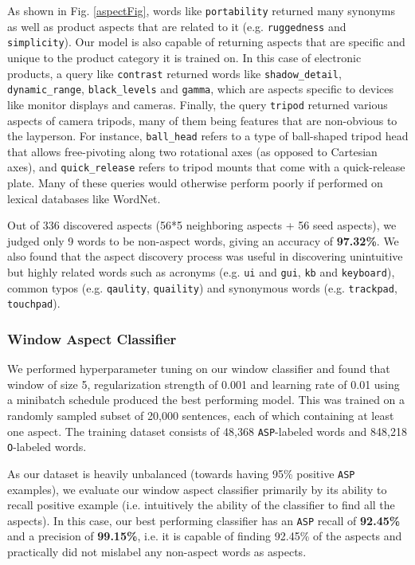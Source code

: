 \documentclass{article} %
\begin{document}
As shown in Fig. \ref{aspectFig}, words like \texttt{portability} returned many synonyms as well as product aspects that are related to it (e.g. \texttt{ruggedness} and \texttt{simplicity}). Our model is also capable of returning aspects that are specific and unique to the product category it is trained on. In this case of electronic products, a query like \texttt{contrast} returned words like \texttt{shadow\_detail}, \texttt{dynamic\_range}, \texttt{black\_levels} and \texttt{gamma}, which are aspects specific to devices like monitor displays and cameras. Finally, the query \texttt{tripod} returned various aspects of camera tripods, many of them being features that are non-obvious to the layperson. For instance, \texttt{ball\_head} refers to a type of ball-shaped tripod head that allows free-pivoting along two rotational axes (as opposed to Cartesian axes), and \texttt{quick\_release} refers to tripod mounts that come with a quick-release plate. Many of these queries would otherwise perform poorly if performed on lexical databases like WordNet.

Out of 336 discovered aspects (56*5 neighboring aspects + 56 seed aspects), we judged only 9 words to be non-aspect words, giving an accuracy of \textbf{97.32\%}. We also found that the aspect discovery process was useful in discovering unintuitive but highly related words such as acronyms (e.g. \texttt{ui} and \texttt{gui}, \texttt{kb} and \texttt{keyboard}), common typos (e.g. \texttt{qaulity}, \texttt{quaility}) and synonymous words (e.g. \texttt{trackpad}, \texttt{touchpad}).

\subsubsection{Window Aspect Classifier}
We performed hyperparameter tuning on our window classifier and found that window of size 5, regularization strength of 0.001 and learning rate of 0.01 using a minibatch schedule produced the best performing model. This was trained on a randomly sampled subset of 20,000 sentences, each of which containing at least one aspect. The training dataset consists of 48,368 \texttt{ASP}-labeled words and 848,218 \texttt{O}-labeled words. 

As our dataset is heavily unbalanced (towards having 95\% positive \texttt{ASP} examples), we evaluate our window aspect classifier primarily by its ability to recall positive example (i.e. intuitively the ability of the classifier to find all the aspects). In this case, our best performing classifier has an \texttt{ASP} recall of \textbf{92.45\%} and a precision of \textbf{99.15\%}, i.e. it is capable of finding 92.45\% of the aspects and practically did not mislabel any non-aspect words as aspects.
\end{document}

